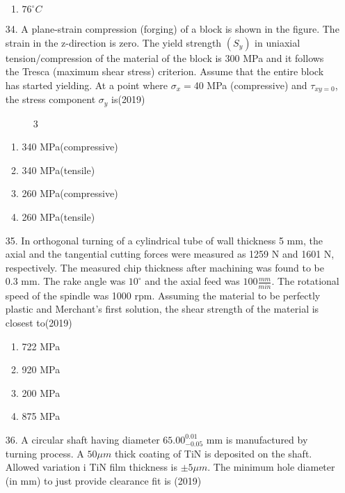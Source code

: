 \documentclass[journal]{IEEEtran}
\begin{document}
\begin{enumerate}
\begin{enumerate}[label=(\Alph*)]
        \item $76^{\circ}C$
    \end{enumerate}
    \item[34.] A plane-strain compression (forging) of a block is shown in the figure. The strain in the z-direction is zero. The yield strength $(S_y)$ in uniaxial tension/compression of the material of the block is 300 MPa and it follows the Tresca (maximum shear stress) criterion. Assume that the entire block has started yielding. At a point where $\sigma_x =$40 MPa (compressive) and $\tau_{xy = 0}$,  the stress component $\sigma_y$ is\hfill (2019)
    \begin{figure}[!ht]
        \centering
        \caption{3}
    \end{figure}
    \begin{enumerate}[label=(\Alph*)]
        \item 340 MPa(compressive)
        \item 340 MPa(tensile)
        \item 260 MPa(compressive)
        \item 260 MPa(tensile)
    \end{enumerate}
    \item[35.] In orthogonal turning of a cylindrical tube of wall thickness 5 mm, the axial and the tangential cutting forces were measured as 1259 N and 1601 N, respectively. The measured chip thickness after machining was found to be 0.3 mm. The rake angle was $10^{\circ}$ and the axial feed was $100 \frac{mm}{min}$. The rotational speed of the spindle was 1000 rpm. Assuming the material to be perfectly plastic and Merchant's first solution, the shear strength of the material is closest to\hfill (2019)
    \begin{enumerate}[label=(\Alph*)]
        \item 722 MPa
        \item 920 MPa
        \item 200 MPa
        \item 875 MPa
    \end{enumerate}
    \item[36.] A circular shaft having diameter $65.00^{0.01}_{-0.05}$ mm is manufactured by turning process. A $50\mu m$ thick coating of TiN is deposited on the shaft. Allowed variation i TiN film thickness is $\pm 5\mu m$. The minimum hole diameter (in mm) to just provide clearance fit is \hfill (2019)
    \begin{enumerate}[label=(\Alph*)]

\end{enumerate}
\end{enumerate}
\end{document}
